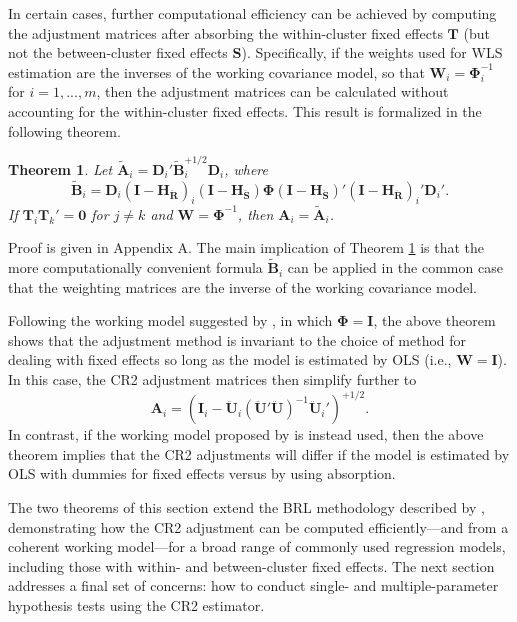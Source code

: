 \documentclass[draft]{ectaart}\usepackage[]{graphicx}\usepackage[]{color}
\newtheorem{thm}{Theorem}
\newcommand{\bm}{\mathbf}
\newcommand{\bs}{\boldsymbol}
\begin{document}
In certain cases, further computational efficiency can be achieved by computing the adjustment matrices after absorbing the within-cluster fixed effects $\bm{T}$ (but not the between-cluster fixed effects $\bm{S}$). 
Specifically, if the weights used for WLS estimation are the inverses of the working covariance model, so that $\bm{W}_i = \bs\Phi_i^{-1}$ for $i = 1,...,m$, then the adjustment matrices can be calculated without accounting for the within-cluster fixed effects. 
This result is formalized in the following theorem.  

\begin{thm}
\label{thm:absorb}
Let $\bm{\tilde{A}}_i = \bm{D}_i'\bm{\tilde{B}}_i^{+1/2} \bm{D}_i$, where 
\begin{equation}
\label{eq:CR2_B_tilde}
\bm{\tilde{B}}_i = \bm{D}_i\left(\bm{I} - \bm{H_{\ddot{R}}}\right)_i \left(\bm{I} - \bm{H_{\ddot{S}}}\right) \bs\Phi \left(\bm{I} - \bm{H_{\ddot{S}}}\right)' \left(\bm{I} - \bm{H_{\ddot{R}}}\right)_i' \bm{D}_i'.
\end{equation}
If $\bm{T}_i \bm{T}_k' = \bm{0}$ for $j \neq k$ and $\bm{W} = \bs\Phi^{-1}$, then $\bm{A}_i = \bm{\tilde{A}}_i$. 
\end{thm}

Proof is given in Appendix A.
The main implication of Theorem \ref{thm:absorb} is that the more computationally convenient formula $\bm{\tilde{B}}_i$ can be applied in the common case that the weighting matrices are the inverse of the working covariance model.

Following the working model suggested by \citet{Bell2002bias}, in which $\bs\Phi = \bm{I}$, the above theorem shows that the adjustment method is invariant to the choice of method for dealing with fixed effects so long as the model is estimated by OLS (i.e., $\bm{W} = \bm{I}$).
In this case, the CR2 adjustment matrices then simplify further to \[
\bm{A}_i = \left(\bm{I}_i - \bm{\ddot{U}}_i\left(\bm{\ddot{U}}'\bm{\ddot{U}}\right)^{-1}\bm{\ddot{U}}_i'\right)^{+1/2}. \]
In contrast, if the working model proposed by \citet{Imbens2015robust} is instead used, then the above theorem implies that the CR2 adjustments will differ if the model is estimated by OLS with dummies for fixed effects versus by using absorption.

The two theorems of this section extend the BRL methodology described by \citet{Bell2002bias}, demonstrating how the CR2 adjustment can be computed efficiently---and from a coherent working model---for a broad range of commonly used regression models, including those with within- and between-cluster fixed effects.
The next section addresses a final set of concerns: how to conduct single- and multiple-parameter hypothesis tests using the CR2 estimator. 
\end{document}
